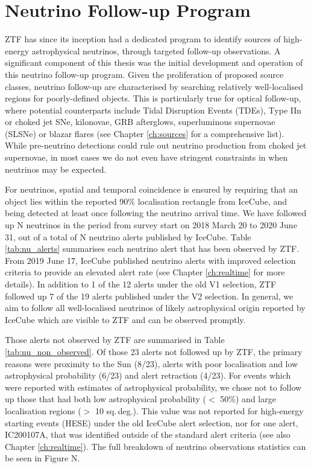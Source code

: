\section{Neutrino Follow-up Program}
ZTF has since its inception had a dedicated program to identify sources of high-energy astrophysical neutrinos, through targeted follow-up observations. A significant component of this thesis was the initial development and operation of this neutrino follow-up program. Given the proliferation of proposed source classes, neutrino follow-up are characterised by searching relatively well-localised regions for poorly-defined objects. This is particularly true for optical follow-up, where potential counterparts include Tidal Disruption Events (TDEs), Type IIn or choked jet SNe, kilonovae, GRB afterglows, superluminous supernovae (SLSNe) or blazar flares (see Chapter \ref{ch:sources} for a comprehensive list). While pre-neutrino detections could rule out neutrino production from choked jet supernovae, in most cases we do not even have stringent constraints in when neutrinos may be expected.

For neutrinos, spatial and temporal coincidence is ensured by requiring that an object lies within the reported 90\% localisation rectangle from IceCube, and being detected at least once following the neutrino arrival time. We have followed up N neutrinos in the period from survey start on 2018 March 20 to 2020 June 31, out of a total of N neutrino alerts published by IceCube. Table \ref{tab:nu_alerts} summarises each neutrino alert that has been observed by ZTF. From 2019 June 17, IceCube published neutrino alerts with improved selection criteria to provide an elevated alert rate  (see Chapter \ref{ch:realtime} for more details). In addition to 1 of the 12 alerts under the old V1 selection, ZTF followed up 7 of the 19 alerts published under the V2 selection. In general, we aim to follow all well-localised neutrinos of likely astrophysical origin reported by IceCube which are visible to ZTF and can be observed promptly. 
 
Those alerts not observed by ZTF are summarised in Table \ref{tab:nu_non_observed}. Of those 23 alerts not followed up by ZTF, the primary reasons were proximity to the Sun (8/23), alerts with poor localisation and low astrophysical probability (6/23) and alert retraction (4/23). For events which were reported with estimates of astrophysical probability, we chose not to follow up those that had both low astrophysical probability ($<$ 50\%) and large localisation regions ($>$ 10 sq.\,deg.). This value was not reported for high-energy starting events (HESE) under the old IceCube alert selection, nor for one alert, IC200107A, that was identified outside of the standard alert criteria  (see also Chapter \ref{ch:realtime}). The full breakdown of neutrino observations statistics can be seen in Figure N.
 
